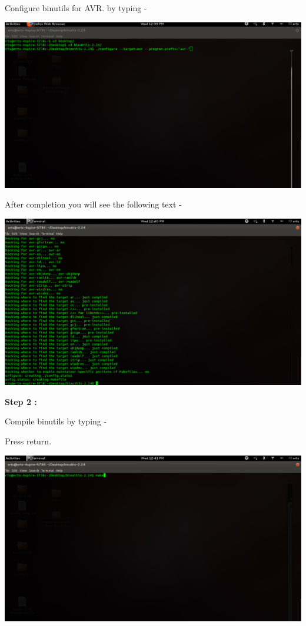 \begin{flushleft}
Configure binutils for AVR. by typing - 
\medskip


\medskip

\includegraphics[scale=0.3]{f5}

\medskip

After completion you will see the following text - 

\medskip

\includegraphics[scale=0.3]{f6}

\medskip

\textbf{Step 2 :}

\medskip

Compile binutils by typing - 
\medskip

\medskip

Press return.

\medskip

\includegraphics[scale=0.3]{f7}



\end{flushleft}
